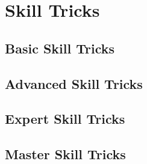\chapter{Skill Tricks}
\label{ch:skill-tricks}

\section{Basic Skill Tricks}
\label{sec:skill-tricks-basic}

\section{Advanced Skill Tricks}
\label{sec:skill-tricks-advanced}

\section{Expert Skill Tricks}
\label{sec:skill-tricks-expert}

\section{Master Skill Tricks}
\label{sec:skill-tricks-master}